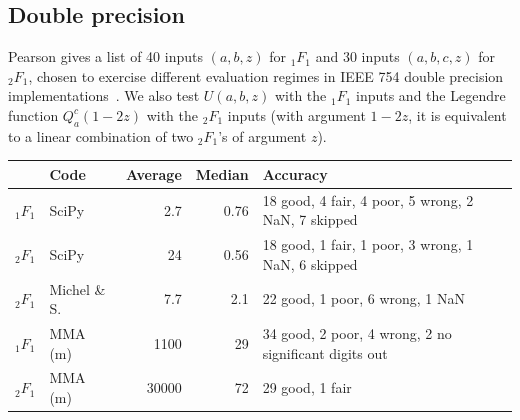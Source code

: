 \documentclass[11pt]{article}
\begin{document}
\subsection{Double precision}

Pearson gives a list of 40 inputs $(a,b,z)$ for ${}_1F_1$
and 30 inputs $(a,b,c,z)$ for ${}_2F_1$, chosen to exercise different
evaluation regimes in IEEE 754 double precision
implementations~\cite{pearson2009computation,pearson2014numerical}.
We also test $U(a,b,z)$ with the ${}_1F_1$ inputs
and the Legendre function $Q_a^c(1-2z)$
with the ${}_2F_1$ inputs (with argument $1-2z$, it is equivalent to a linear
combination of two ${}_2F_1$'s of argument $z$).

\begin{table}
\renewcommand{\arraystretch}{1.4}
\setlength{\tabcolsep}{.4em}
\begin{center}
\begin{scriptsize}
\begin{tabular}{l l | r r | l}
          & Code & Average & Median   & Accuracy \\
\hline
${}_1F_1$ & SciPy         & 2.7 & 0.76         & 18 good, 4 fair, 4 poor, 5 wrong, 2 NaN, 7 skipped\\
${}_2F_1$ & SciPy         & 24   & 0.56        & 18 good, 1 fair, 1 poor, 3 wrong, 1 NaN, 6 skipped \\
\hline
${}_2F_1$ & Michel \& S.  & 7.7  & 2.1 & 22 good, 1 poor, 6 wrong, 1 NaN \\
\hline
${}_1F_1$ & MMA (m)       & 1100      &     29 & 34 good, 2 poor, 4 wrong, 2 no significant digits out \\
${}_2F_1$ & MMA (m)       & 30000     &     72   & 29 good, 1 fair \\


\end{tabular}
\end{scriptsize}
\end{center}
\end{table}
\end{document}
